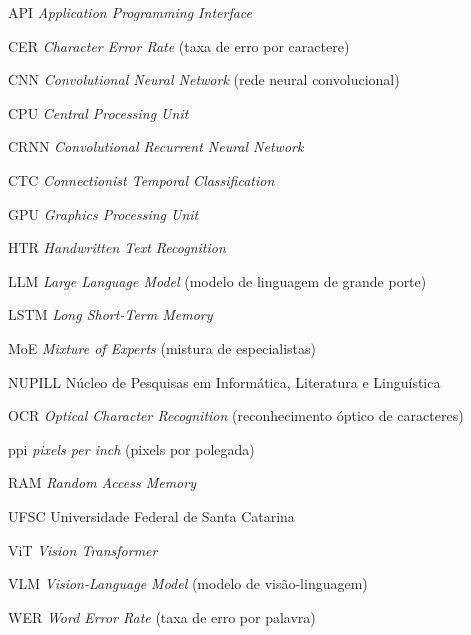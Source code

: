\documentclass[noabntexcite,oneside]{ufsc-thesis-rn46-2019}
\begin{document}
\listoftables*
\cleardoublepage

\begin{siglas}
  \item[API] \textit{Application Programming Interface}
  \item[CER] \textit{Character Error Rate} (taxa de erro por caractere)
  \item[CNN] \textit{Convolutional Neural Network} (rede neural convolucional)
  \item[CPU] \textit{Central Processing Unit}
  \item[CRNN] \textit{Convolutional Recurrent Neural Network}
  \item[CTC] \textit{Connectionist Temporal Classification}
  \item[GPU] \textit{Graphics Processing Unit}
  \item[HTR] \textit{Handwritten Text Recognition}
  \item[LLM] \textit{Large Language Model} (modelo de linguagem de grande porte)
  \item[LSTM] \textit{Long Short-Term Memory}
  \item[MoE] \textit{Mixture of Experts} (mistura de especialistas)
  \item[NUPILL] Núcleo de Pesquisas em Informática, Literatura e Linguística
  \item[OCR] \textit{Optical Character Recognition} (reconhecimento óptico de caracteres)
  \item[ppi] \textit{pixels per inch} (pixels por polegada)
  \item[RAM] \textit{Random Access Memory}
  \item[UFSC] Universidade Federal de Santa Catarina
  \item[ViT] \textit{Vision Transformer}
  \item[VLM] \textit{Vision-Language Model} (modelo de visão-linguagem)
  \item[WER] \textit{Word Error Rate} (taxa de erro por palavra)
\end{siglas}
\cleardoublepage

\tableofcontents*
\cleardoublepage

\textual

\end{document}
